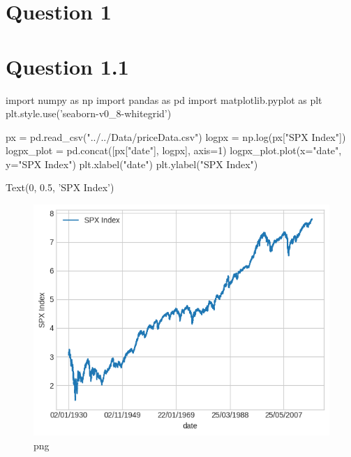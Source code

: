 \hypertarget{question-1}{%
\section{Question 1}\label{question-1}}

\hypertarget{question-1.1}{%
\section{Question 1.1}\label{question-1.1}}

\begin{python}[language=Python]
import numpy as np 
import pandas as pd 
import matplotlib.pyplot as plt 
plt.style.use('seaborn-v0_8-whitegrid')
\end{python}

\begin{python}[language=Python]
px = pd.read_csv("../../Data/priceData.csv")
logpx = np.log(px["SPX Index"])
logpx_plot = pd.concat([px["date"], logpx], axis=1)
logpx_plot.plot(x="date", y="SPX Index")
plt.xlabel("date")
plt.ylabel("SPX Index")
\end{python}

\begin{python}
Text(0, 0.5, 'SPX Index')
\end{python}

\begin{figure}[h]
\centering
\includegraphics[scale=0.75]{ProcessingStockPriceData_files/ProcessingStockPriceData_3_1.png}
\caption{png}
\end{figure}

